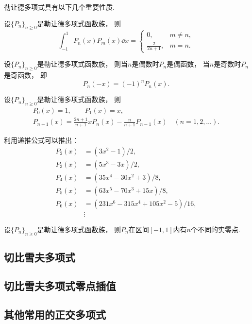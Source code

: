 勒让德多项式具有以下几个重要性质.
\begin{property}
设\(\{P_n\}_{n\geq0}\)是勒让德多项式函数族，
则\begin{equation}
	\int_{-1}^1 P_n(x) P_m(x) \dd{x}
	= \begin{cases}
		0, & m \neq n, \\
		\frac2{2n+1}, & m = n.
	\end{cases}
\end{equation}
\end{property}

\begin{property}
设\(\{P_n\}_{n\geq0}\)是勒让德多项式函数族，
则当\(n\)是偶数时\(P_n\)是偶函数，
当\(n\)是奇数时\(P_n\)是奇函数，
即\begin{equation}
	P_n(-x) = (-1)^n P_n(x).
\end{equation}
\end{property}

\begin{property}
设\(\{P_n\}_{n\geq0}\)是勒让德多项式函数族，
则\begin{gather}
	P_0(x) = 1,
	\qquad
	P_1(x) = x, \\
	P_{n+1}(x)
	= \frac{2n+1}{n+1} x P_n(x)
	- \frac{n}{n+1} P_{n-1}(x)
	\quad(n=1,2,\dotsc).
\end{gather}
\end{property}

利用递推公式可以推出：\begin{align*}
	P_2(x) &= (3x^2-1)/2, \\
	P_3(x) &= (5x^3-3x)/2, \\
	P_4(x) &= (35x^4-30x^2+3)/8, \\
	P_5(x) &= (63x^5-70x^3+15x)/8, \\
	P_6(x) &= (231x^6-315x^4+105x^2-5)/16, \\
	&\vdots
\end{align*}

\begin{property}
设\(\{P_n\}_{n\geq0}\)是勒让德多项式函数族，
则\(P_n\)在区间\([-1,1]\)内有\(n\)个不同的实零点.
\end{property}

\subsection{切比雪夫多项式}

\subsection{切比雪夫多项式零点插值}

\subsection{其他常用的正交多项式}
